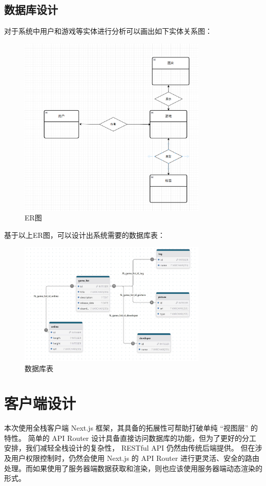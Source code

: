 \documentclass[12pt]{ctexart} %
\begin{document}
\subsection{数据库设计}
对于系统中用户和游戏等实体进行分析可以画出如下实体关系图：
\begin{figure}[H]
  \centering
  \includegraphics[width=0.8\textwidth]{dataset_ER.png}
  \caption{ER图}
\end{figure}
基于以上ER图，可以设计出系统需要的数据库表：
\begin{figure}[H]
  \centering
  \includegraphics[width=0.8\textwidth]{dataset_metadata.jpg}
  \caption{数据库表}
\end{figure}

\section{客户端设计}

本次使用全栈客户端 Next.js 框架，其具备的拓展性可帮助打破单纯 “视图层” 的特性。
简单的 API Router 设计具备直接访问数据库的功能，但为了更好的分工安排，我们减轻全栈设计的复杂性， RESTful API 仍然由传统后端提供。
但在涉及用户权限控制时，仍然会使用 Next.js 的 API Router 进行更灵活、安全的路由处理。而如果使用了服务器端数据获取和渲染，则也应该使用服务器端动态渲染的形式。
\end{document}
